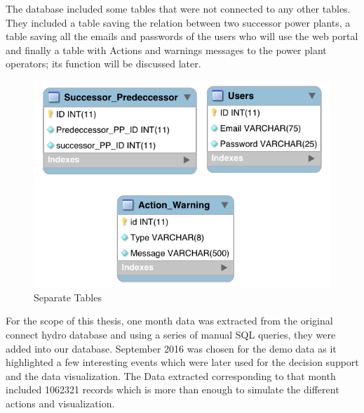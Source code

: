 The database included some tables that were not connected to any other tables. They included a table saving the relation between two successor power plants, a table saving all the emails and passwords of the users who will use the web portal and finally a table with Actions and warnings messages to the power plant operators; its function will be discussed later.
\begin{figure}[H]
\centering
\includegraphics[scale=0.5]{Images/Othertables.png}
\caption[Separate Tables]{Separate Tables}
\end{figure}
For the scope of this thesis, one month data was extracted from the original connect hydro database and using a series of manual SQL queries, they were added into our database. September 2016 was chosen for the demo data as it highlighted a few interesting events which were later used for the decision support and the data visualization. The Data extracted corresponding to that month included 1062321 records which is more than enough to simulate the different actions and visualization.
